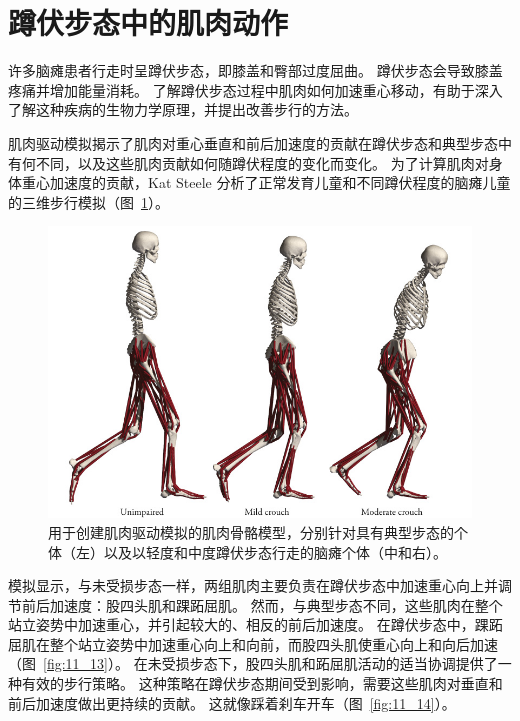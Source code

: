 \section{蹲伏步态中的肌肉动作}

许多脑瘫患者行走时呈蹲伏步态，即膝盖和臀部过度屈曲。
蹲伏步态会导致膝盖疼痛并增加能量消耗。
了解蹲伏步态过程中肌肉如何加速重心移动，有助于深入了解这种疾病的生物力学原理，并提出改善步行的方法。


肌肉驱动模拟揭示了肌肉对重心垂直和前后加速度的贡献在蹲伏步态和典型步态中有何不同，以及这些肌肉贡献如何随蹲伏程度的变化而变化。
为了计算肌肉对身体重心加速度的贡献，Kat Steele 分析了正常发育儿童和不同蹲伏程度的脑瘫儿童的三维步行模拟（图~\ref{fig:11_12}）。


\begin{figure}[!htb]
	\centering
	\includegraphics[width=1.0\linewidth]{chap11/11_12}
	\caption{用于创建肌肉驱动模拟的肌肉骨骼模型，分别针对具有典型步态的个体（左）以及以轻度和中度蹲伏步态行走的脑瘫个体（中和右）\cite{steele2013muscle}。 \label{fig:11_12}}
\end{figure}


模拟显示，与未受损步态一样，两组肌肉主要负责在蹲伏步态中加速重心向上并调节前后加速度：股四头肌和踝跖屈肌。
然而，与典型步态不同，这些肌肉在整个站立姿势中加速重心，并引起较大的、相反的前后加速度。
在蹲伏步态中，踝跖屈肌在整个站立姿势中加速重心向上和向前，而股四头肌使重心向上和向后加速（图~\ref{fig:11_13}）。
在未受损步态下，股四头肌和跖屈肌活动的适当协调提供了一种有效的步行策略。
这种策略在蹲伏步态期间受到影响，需要这些肌肉对垂直和前后加速度做出更持续的贡献。
这就像踩着刹车开车（图~\ref{fig:11_14}）。


